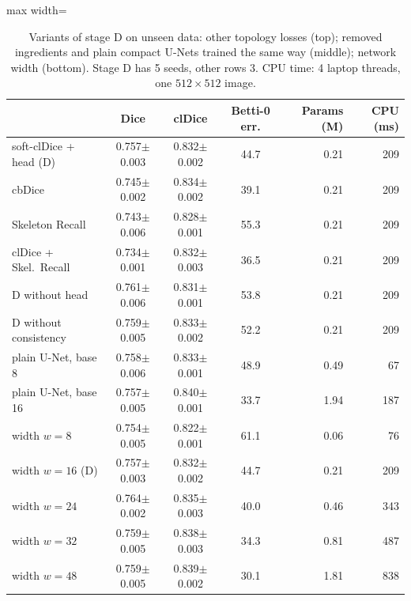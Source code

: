\begin{table}[t]
\centering
\caption{Variants of stage D on unseen data: other topology losses (top); removed ingredients and plain compact U-Nets trained the same way (middle); network width (bottom). Stage D has 5 seeds, other rows 3. CPU time: 4 laptop threads, one $512{\times}512$ image.}
\label{tab:variants}
\small
\begin{adjustbox}{max width=\columnwidth}\begin{tabular}{l ccc rr}
\toprule
 & Dice & clDice & Betti-0 err. & Params (M) & CPU (ms) \\
\midrule
soft-clDice + head (D) & 0.757{\scriptsize$\pm$0.003} & 0.832{\scriptsize$\pm$0.002} & 44.7 & 0.21 & 209 \\
cbDice & 0.745{\scriptsize$\pm$0.002} & 0.834{\scriptsize$\pm$0.002} & 39.1 & 0.21 & 209 \\
Skeleton Recall & 0.743{\scriptsize$\pm$0.006} & 0.828{\scriptsize$\pm$0.001} & 55.3 & 0.21 & 209 \\
clDice + Skel.\ Recall & 0.734{\scriptsize$\pm$0.001} & 0.832{\scriptsize$\pm$0.003} & 36.5 & 0.21 & 209 \\
\midrule
D without head & 0.761{\scriptsize$\pm$0.006} & 0.831{\scriptsize$\pm$0.001} & 53.8 & 0.21 & 209 \\
D without consistency & 0.759{\scriptsize$\pm$0.005} & 0.833{\scriptsize$\pm$0.002} & 52.2 & 0.21 & 209 \\
plain U-Net, base 8 & 0.758{\scriptsize$\pm$0.006} & 0.833{\scriptsize$\pm$0.001} & 48.9 & 0.49 & 67 \\
plain U-Net, base 16 & 0.757{\scriptsize$\pm$0.005} & 0.840{\scriptsize$\pm$0.001} & 33.7 & 1.94 & 187 \\
\midrule
width $w{=}8$ & 0.754{\scriptsize$\pm$0.005} & 0.822{\scriptsize$\pm$0.001} & 61.1 & 0.06 & 76 \\
width $w{=}16$ (D) & 0.757{\scriptsize$\pm$0.003} & 0.832{\scriptsize$\pm$0.002} & 44.7 & 0.21 & 209 \\
width $w{=}24$ & 0.764{\scriptsize$\pm$0.002} & 0.835{\scriptsize$\pm$0.003} & 40.0 & 0.46 & 343 \\
width $w{=}32$ & 0.759{\scriptsize$\pm$0.005} & 0.838{\scriptsize$\pm$0.003} & 34.3 & 0.81 & 487 \\
width $w{=}48$ & 0.759{\scriptsize$\pm$0.005} & 0.839{\scriptsize$\pm$0.002} & 30.1 & 1.81 & 838 \\
\bottomrule
\end{tabular}\end{adjustbox}
\end{table}